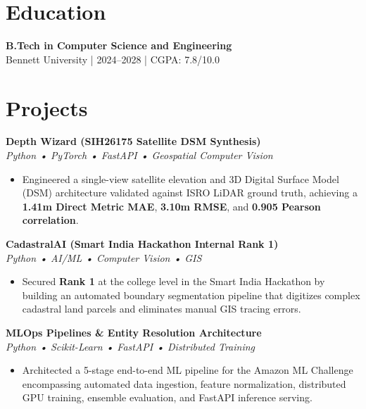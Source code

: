 \documentclass[10pt,a4paper]{article}
\newenvironment{leftcolumn}{\begin{minipage}[t]{0.62\textwidth}}{\end{minipage}\hfill}
\begin{document}
\begin{leftcolumn}

\section*{Education}
\textbf{B.Tech in Computer Science and Engineering} \\
Bennett University | 2024--2028 | CGPA: 7.8/10.0

\section*{Projects}

\textbf{Depth Wizard (SIH26175 Satellite DSM Synthesis)} \\
\textit{Python • PyTorch • FastAPI • Geospatial Computer Vision} \\
\vspace{-15pt}
\begin{itemize}[leftmargin=12pt, itemsep=0pt]
    \item Engineered a single-view satellite elevation and 3D Digital Surface Model (DSM) architecture validated against ISRO LiDAR ground truth, achieving a \textbf{1.41m Direct Metric MAE}, \textbf{3.10m RMSE}, and \textbf{0.905 Pearson correlation}.
\end{itemize}

\textbf{CadastralAI (Smart India Hackathon Internal Rank 1)} \\
\textit{Python • AI/ML • Computer Vision • GIS} \\
\vspace{-15pt}
\begin{itemize}[leftmargin=12pt, itemsep=0pt]
    \item Secured \textbf{Rank 1} at the college level in the Smart India Hackathon by building an automated boundary segmentation pipeline that digitizes complex cadastral land parcels and eliminates manual GIS tracing errors.
\end{itemize}

\textbf{MLOps Pipelines \& Entity Resolution Architecture} \\
\textit{Python • Scikit-Learn • FastAPI • Distributed Training} \\
\vspace{-15pt}
\begin{itemize}[leftmargin=12pt, itemsep=0pt]
    \item Architected a 5-stage end-to-end ML pipeline for the Amazon ML Challenge encompassing automated data ingestion, feature normalization, distributed GPU training, ensemble evaluation, and FastAPI inference serving.
\end{itemize}


\end{leftcolumn}
\end{document}
